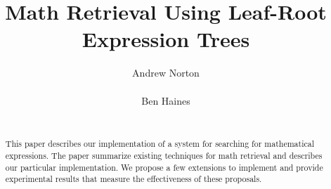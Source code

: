 \documentclass{sig-alternate}
\begin{document}
%

\title{Math Retrieval Using Leaf-Root Expression Trees} 

%
\author{
%
%
\alignauthor
Andrew Norton
       \\
       \\
\alignauthor
Ben Haines
       \\
       \\
}

\maketitle
\begin{abstract}
This paper describes our implementation of a system for
searching for mathematical expressions. The paper summarize
existing techniques for math retrieval and describes our particular
implementation. We propose a few extensions to implement and 
provide experimental results that measure the effectiveness of
these proposals.
\end{abstract}
\end{document}
